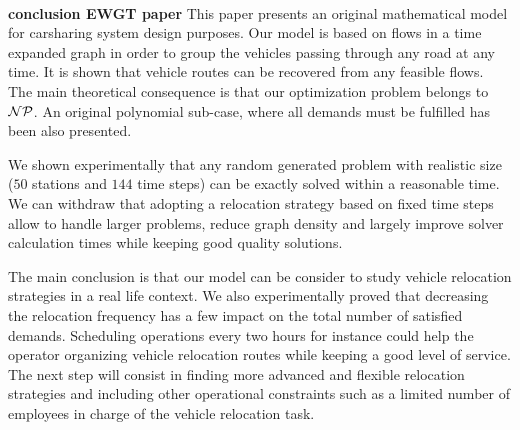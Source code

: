 ~\\
\textbf{conclusion EWGT paper}
This paper presents an original mathematical model for carsharing system design purposes.
Our model is based on flows in a time expanded graph in order to group the vehicles passing through any road at any time. 
It is shown that vehicle routes can be recovered from any feasible flows.
The main theoretical consequence is that our optimization problem belongs to ${\cal NP}$.
An original polynomial sub-case, where all demands must be fulfilled has been also presented.

We shown experimentally that any random generated problem with realistic size ($50$ stations and $144$ time steps) can be exactly solved within a reasonable time.
We can withdraw that adopting a relocation strategy based on fixed time steps allow to handle larger problems, reduce graph density and largely improve solver calculation times while keeping good quality solutions.

The main conclusion is that our model can be consider to study vehicle relocation strategies in a real life context.
We also experimentally proved that decreasing the relocation frequency has a few impact on the total number of satisfied demands.
Scheduling operations every two hours for instance could help the operator organizing vehicle relocation routes while keeping a good level of service.
The next step will consist in finding more advanced and flexible relocation strategies and including other operational constraints such as a limited number of employees in charge of the vehicle relocation task.
